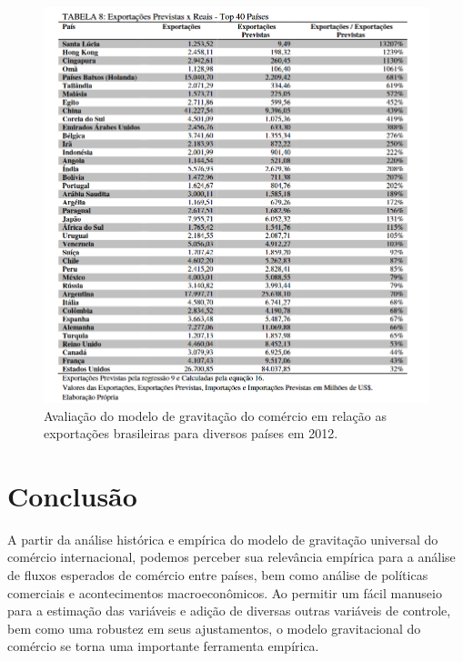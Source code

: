 \documentclass[12pt]{article}
\begin{document}
\begin{figure}[h]
\centering
\includegraphics[width=1\textwidth]{crossec2.png}
\caption{\label{fig:crossec2}Avaliação do modelo de gravitação do comércio em relação as exportações brasileiras para diversos países em 2012.}
\end{figure}

\section{Conclusão}
A partir da análise histórica e empírica do modelo de gravitação universal do comércio internacional, podemos perceber sua relevância empírica para a análise de fluxos esperados de comércio entre países, bem como análise de políticas comerciais e acontecimentos macroeconômicos. Ao permitir um fácil manuseio para a estimação das variáveis e adição de diversas outras variáveis de controle, bem como uma robustez em seus ajustamentos, o modelo gravitacional do comércio se torna uma importante ferramenta empírica. 




\end{document}
